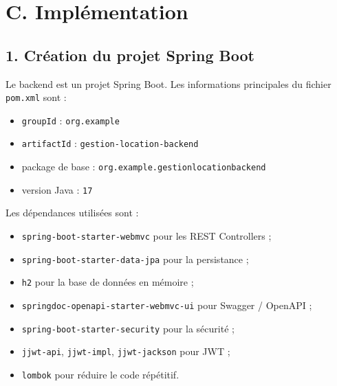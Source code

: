 \documentclass[12pt,a4paper]{article}
\newcommand{\code}[1]{\texttt{#1}}
\newcommand{\question}[1]{\subsection*{#1}}
\begin{document}
\begin{center}
{
}
\end{center}

\section{C. Implémentation}

\question{1. Création du projet Spring Boot}

Le backend est un projet Spring Boot.
Les informations principales du fichier \code{pom.xml} sont :

\begin{itemize}
    \item \code{groupId} : \code{org.example}
    \item \code{artifactId} : \code{gestion-location-backend}
    \item package de base : \code{org.example.gestionlocationbackend}
    \item version Java : \code{17}
\end{itemize}

Les dépendances utilisées sont :

\begin{itemize}
    \item \code{spring-boot-starter-webmvc} pour les REST Controllers ;
    \item \code{spring-boot-starter-data-jpa} pour la persistance ;
    \item \code{h2} pour la base de données en mémoire ;
    \item \code{springdoc-openapi-starter-webmvc-ui} pour Swagger / OpenAPI ;
    \item \code{spring-boot-starter-security} pour la sécurité ;
    \item \code{jjwt-api}, \code{jjwt-impl}, \code{jjwt-jackson} pour JWT ;
    \item \code{lombok} pour réduire le code répétitif.
\end{itemize}
\end{document}
